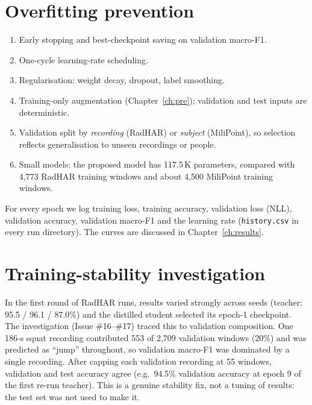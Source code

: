 \section{Overfitting prevention}
\begin{enumerate}[nosep]
\item Early stopping and best-checkpoint saving on validation macro-F1.
\item One-cycle learning-rate scheduling.
\item Regularisation: weight decay, dropout, label smoothing.
\item Training-only augmentation (Chapter~\ref{ch:pre}); validation and test inputs are deterministic.
\item Validation split by \emph{recording} (RadHAR) or \emph{subject} (MiliPoint), so selection
  reflects generalisation to unseen recordings or people.
\item Small models: the proposed model has 117.5\,K parameters, compared with 4{,}773 RadHAR
  training windows and about 4{,}500 MiliPoint training windows.
\end{enumerate}
For every epoch we log training loss, training accuracy, validation loss (NLL),
validation accuracy, validation macro-F1 and the learning rate
(\texttt{history.csv} in every run directory). The curves are discussed in
Chapter~\ref{ch:results}.

\section{Training-stability investigation}
In the first round of RadHAR runs, results varied strongly across seeds
(teacher: 95.5 / 96.1 / 87.0\%) and the distilled student selected its epoch-1
checkpoint. The investigation (Issue \#16--\#17) traced this to validation
composition. One 186-s squat recording contributed 553 of 2{,}709 validation
windows (20\%) and was predicted as ``jump'' throughout, so validation macro-F1
was dominated by a single recording. After capping each validation recording at 55
windows, validation and test accuracy agree (e.g.\ 94.5\% validation accuracy at
epoch 9 of the first re-run teacher). This is a genuine stability fix, not a
tuning of results: the test set was not used to make it.
